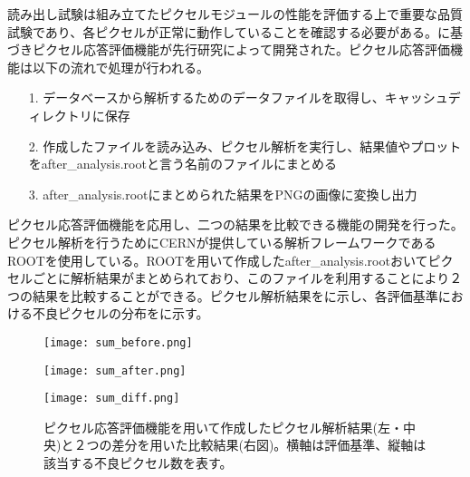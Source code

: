 読み出し試験は組み立てたピクセルモジュールの性能を評価する上で重要な品質試験であり、各ピクセルが正常に動作していることを確認する必要がある。に基づきピクセル応答評価機能が先行研究\cite{oku}によって開発された。ピクセル応答評価機能は以下の流れで処理が行われる。
\begin{itemize}
  \item[1. ] データベースから解析するためのデータファイルを取得し、キャッシュディレクトリに保存
  \item[2. ] 作成したファイルを読み込み、ピクセル解析を実行し、結果値やプロットをafter\_analysis.rootと言う名前のファイルにまとめる
  \item[3. ] after\_analysis.rootにまとめられた結果をPNGの画像に変換し出力
\end{itemize}

ピクセル応答評価機能を応用し、二つの結果を比較できる機能の開発を行った。ピクセル解析を行うためにCERNが提供している解析フレームワークであるROOTを使用している。ROOTを用いて作成したafter\_analysis.rootおいてピクセルごとに解析結果がまとめられており、このファイルを利用することにより２つの結果を比較することができる。ピクセル解析結果をに示し、各評価基準における不良ピクセルの分布をに示す。

\begin{figure}[tbp]
 \begin{minipage}{0.33\hsize}
  \begin{center}
   \texttt{[image: sum\_before.png]}
  \end{center}
 \end{minipage}
 \begin{minipage}{0.33\hsize}
 \begin{center}
  \texttt{[image: sum\_after.png]}
 \end{center}
 \end{minipage}
 \begin{minipage}{0.33\hsize}
 \begin{center}
  \texttt{[image: sum\_diff.png]}
 \end{center}
 \end{minipage}
 \caption{ピクセル応答評価機能を用いて作成したピクセル解析結果(左・中央)と２つの差分を用いた比較結果(右図)。横軸は評価基準、縦軸は該当する不良ピクセル数を表す。}
 \label{fig:badsum}
\end{figure}

